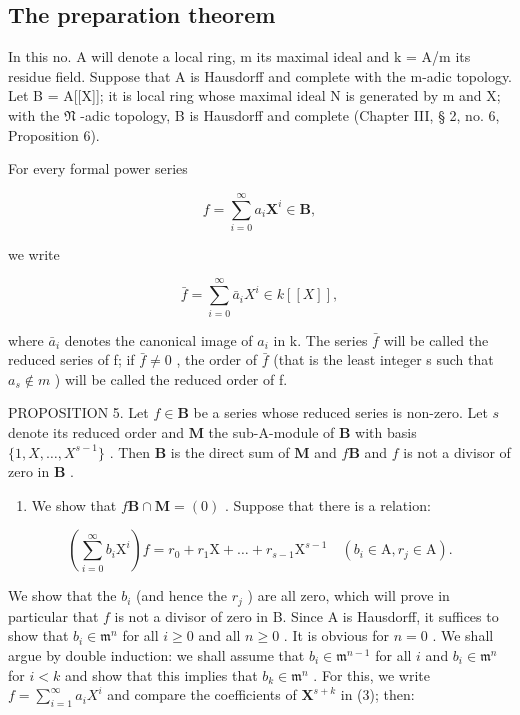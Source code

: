 \subsection{The preparation theorem}

In this no. A will denote a local ring, m its maximal ideal and k = A/m its residue field. Suppose that A is Hausdorff and complete with the m-adic topology. Let B = A{[}{[}X{]}{]}; it is local ring whose maximal ideal N is generated by m and X; with the \(\mathfrak{N}\) -adic topology, B is Hausdorff and complete (Chapter III, § 2, no. 6, Proposition 6).

For every formal power series

\[
f = \sum_ {i = 0} ^ {\infty} a _ {i} \mathbf {X} ^ {i} \in \mathbf {B},
\]

we write

\[
\bar {f} = \sum_ {i = 0} ^ {\infty} \bar {a} _ {i} X ^ {i} \in k [ [ X ] ],
\]

where \(\bar{a}_{i}\) denotes the canonical image of \(a_{i}\) in k. The series \(\bar{f}\) will be called the reduced series of f; if \(\bar{f} \neq 0\) , the order of \(\bar{f}\) (that is the least integer s such that \(a_{s} \notin m\) ) will be called the reduced order of f.

PROPOSITION 5. Let \(f \in \mathbf{B}\) be a series whose reduced series is non-zero. Let \(s\) denote its reduced order and \(\mathbf{M}\) the sub-A-module of \(\mathbf{B}\) with basis \(\{1, X, \ldots, X^{s-1}\}\) . Then \(\mathbf{B}\) is the direct sum of \(\mathbf{M}\) and \(f\mathbf{B}\) and \(f\) is not a divisor of zero in \(\mathbf{B}\) .

\begin{enumerate}
\def\labelenumi{(\alph{enumi})}
\tightlist
\item
  We show that \(f\mathbf{B} \cap \mathbf{M} = (0)\) . Suppose that there is a relation:
\end{enumerate}

\[
\left(\sum_ {i = 0} ^ {\infty} b _ {i} \mathrm{X} ^ {i}\right) f = r _ {0} + r _ {1} \mathrm{X} + \dots + r _ {s - 1} \mathrm{X} ^ {s - 1} \quad (b _ {i} \in \mathrm{A}, r _ {j} \in \mathrm{A}).\tag{3}
\]

We show that the \(b_{i}\) (and hence the \(r_{j}\) ) are all zero, which will prove in particular that \(f\) is not a divisor of zero in B. Since A is Hausdorff, it suffices to show that \(b_{i} \in \mathfrak{m}^{n}\) for all \(i \geqslant 0\) and all \(n \geqslant 0\) . It is obvious for \(n = 0\) . We shall argue by double induction: we shall assume that \(b_{i} \in \mathfrak{m}^{n-1}\) for all \(i\) and \(b_{i} \in \mathfrak{m}^{n}\) for \(i < k\) and show that this implies that \(b_{k} \in \mathfrak{m}^{n}\) . For this, we write \(f = \sum_{i=1}^{\infty} a_{i} X^{i}\) and compare the coefficients of \(\mathbf{X}^{s+k}\) in (3); then:


